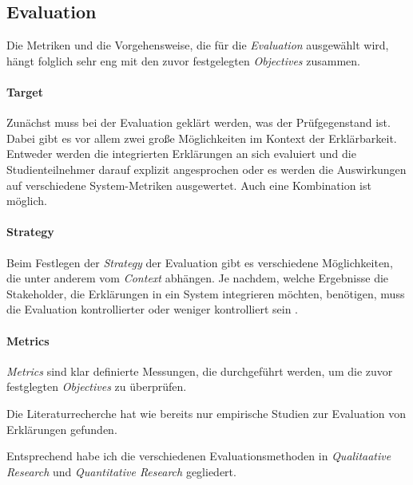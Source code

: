 \subsection{Evaluation}
\label{sec:model_evaluation_description}

Die Metriken und die Vorgehensweise, die für die \textit{Evaluation} ausgewählt wird, hängt folglich sehr eng mit den zuvor festgelegten \textit{Objectives} zusammen.

\paragraph{Target} Zunächst muss bei der Evaluation geklärt werden, was der Prüfgegenstand ist. Dabei gibt es vor allem zwei große Möglichkeiten im Kontext der Erklärbarkeit. Entweder werden die integrierten Erklärungen an sich evaluiert und die Studienteilnehmer darauf explizit angesprochen oder es werden die Auswirkungen auf verschiedene System-Metriken ausgewertet. Auch eine Kombination ist möglich.

\paragraph{Strategy} Beim Festlegen der \textit{Strategy} der Evaluation gibt es verschiedene Möglichkeiten, die unter anderem vom \textit{Context} abhängen. Je nachdem, welche Ergebnisse die Stakeholder, die Erklärungen in ein System integrieren möchten, benötigen, muss die Evaluation kontrollierter oder weniger kontrolliert sein \cite[vgl.][]{wohlin2012experimentation}.

\paragraph{Metrics} \textit{Metrics} sind klar definierte Messungen, die durchgeführt werden, um die zuvor festglegten \textit{Objectives} zu überprüfen.

Die Literaturrecherche hat wie bereits \cite{nunes_systematic_2017} nur empirische Studien zur Evaluation von Erklärungen gefunden.

Entsprechend \cite{wohlin2012experimentation} habe ich die verschiedenen Evaluationsmethoden in \textit{Qualitaative Research} und \textit{Quantitative Research} gegliedert.


